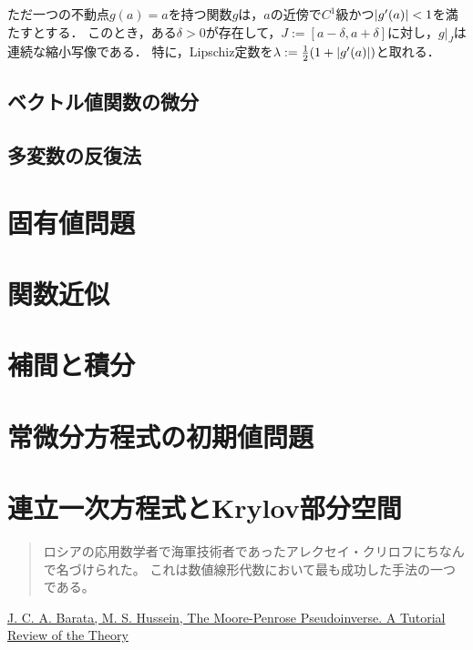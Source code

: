 \documentclass[uplatex, dvipdfmx]{jsreport}
\begin{document}
\begin{proposition}
    ただ一つの不動点$g(a)=a$を持つ関数$g$は，$a$の近傍で$C^1$級かつ$\lvert g'(a)\rvert<1$を満たすとする．
    このとき，ある$\delta>0$が存在して，$J:=[a-\delta,a+\delta]$に対し，$g|_J$は連続な縮小写像である．
    特に，Lipschiz定数を$\lambda:=\frac{1}{2}(1+\lvert g'(a)\rvert)$と取れる．
\end{proposition}

\section{ベクトル値関数の微分}

\section{多変数の反復法}

\chapter{固有値問題}

\chapter{関数近似}

\chapter{補間と積分}

\chapter{常微分方程式の初期値問題}

\chapter{連立一次方程式とKrylov部分空間}

\begin{quotation}
    ロシアの応用数学者で海軍技術者であったアレクセイ・クリロフにちなんで名づけられた。
    これは数値線形代数において最も成功した手法の一つである。 
\end{quotation}

\begin{thebibliography}{9}
    \href{https://arxiv.org/abs/1110.6882v1}{J. C. A. Barata, M. S. Hussein, The Moore-Penrose Pseudoinverse. A Tutorial Review of the Theory}
\end{thebibliography}
\end{document}
